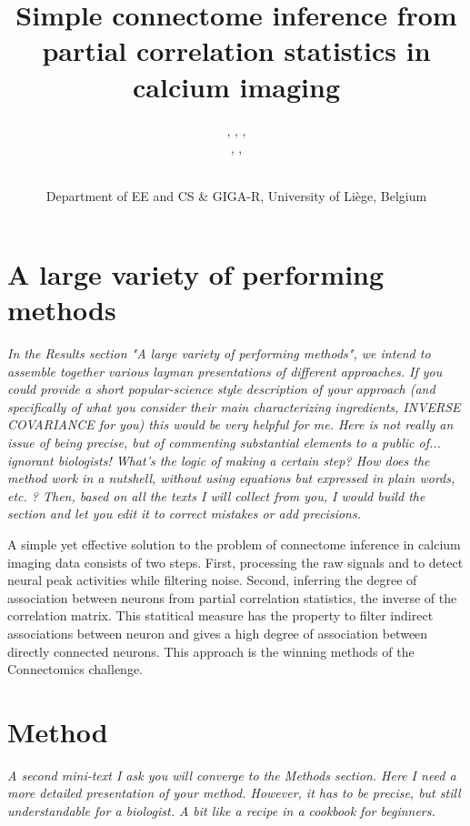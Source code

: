 \documentclass[wcp]{jmlr}
\title{Simple connectome inference from partial correlation statistics in calcium imaging}
\author{\Name{Antonio Sutera},
   \Name{Arnaud Joly},
   \Name{Vincent François-Lavet}, \Email{a.sutera@ulg.ac.be}\\
   \Name{Zixiao Aaron Qiu},
   \Name{Gilles Louppe},
   \Name{Damien Ernst}\and\Name{Pierre Geurts}
    \\
   \addr Department of EE and CS \& GIGA-R, University of Li\`ege, Belgium}
\begin{document}
\section{A large variety of performing methods}

\emph{
In the Results section "A large variety of performing methods", we intend to
assemble together various layman presentations of different approaches. If you
could provide a short popular-science style description of your approach (and
specifically of what you consider their main characterizing ingredients,
INVERSE COVARIANCE for you) this would be very helpful for me.  Here is not
really an issue of being precise, but of commenting substantial elements to a
public of... ignorant biologists! What's the logic of making a certain step?
How does the method work in a nutshell, without using equations but expressed
in plain words, etc. ? Then, based on all the texts I will collect from you, I
would build the section and let you edit it to correct mistakes or add
precisions.
}

A simple yet effective solution to the problem of connectome inference in
calcium imaging data consists of two steps. \cite{sutera2014simple} First,
processing the raw signals and to detect neural peak activities while filtering
noise. Second, inferring the degree of association between neurons from partial
correlation statistics, the inverse of the correlation matrix. This statitical
measure has the property to filter indirect associations between neuron and
gives a high degree of association between directly connected neurons. This
approach is the winning methods of the Connectomics challenge.

\section{Method}
\emph{A second mini-text I ask you will converge to the Methods section. Here I need
a more detailed presentation of your method. However, it has to be precise, but
still understandable for a biologist. A bit like a recipe in a cookbook for
beginners.}




\end{document}
